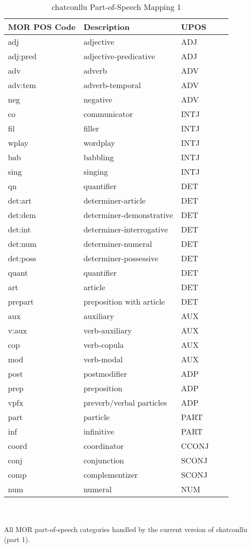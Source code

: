 \newpage
\begin{table}[htp!]
\caption {chatconllu Part-of-Speech Mapping 1} \label{tab:posmap1}
\begin{tabular}{@{}lllll@{}}
\toprule
\textbf{MOR POS Code} & \textbf{Description} & \textbf{UPOS}\\ \midrule
adj & adjective & ADJ\\
adj:pred & adjective-predicative & ADJ\\\midrule
adv & adverb & ADV\\
adv:tem & adverb-temporal & ADV\\
neg & negative & ADV\\\midrule
co & communicator & INTJ\\
fil & filler & INTJ\\
wplay & wordplay & INTJ\\
bab & babbling & INTJ\\
sing & singing & INTJ\\\midrule
qn & quantifier & DET\\
det:art & determiner-article & DET\\
det:dem & determiner-demonstrative & DET\\
det:int & determiner-interrogative & DET\\
det:num & determiner-numeral & DET\\
det:poss & determiner-possessive & DET\\
quant & quantifier & DET\\
art & article & DET\\
prepart & preposition with article & DET\\\midrule
aux & auxiliary & AUX\\
v:aux & verb-auxiliary & AUX\\
cop & verb-copula & AUX\\
mod & verb-modal & AUX\\\midrule
post & postmodifier & ADP\\
prep & preposition & ADP\\
vpfx & preverb/verbal particles & ADP\\\midrule
part & particle & PART\\
inf & infinitive & PART\\\midrule
coord & coordinator & CCONJ\\\midrule
conj & conjunction & SCONJ\\
comp & complementizer & SCONJ\\\midrule
num & numeral & NUM\\\bottomrule
\end{tabular}\\
\vspace{0.5cm}\\
All MOR part-of-speech categories handled by the current version of chatconllu (part 1).\\
\end{table}
